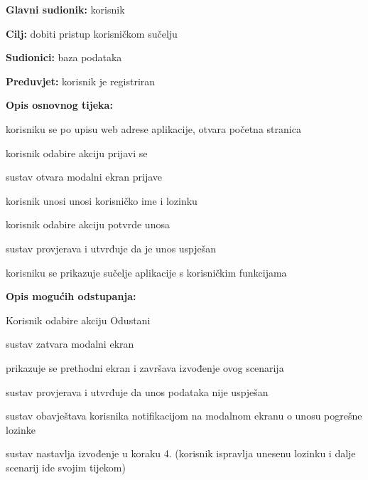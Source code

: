                     \noindent {}
					\begin{packed_item}
	
						\item \textbf{Glavni sudionik: }korisnik
						\item  \textbf{Cilj: }dobiti pristup korisničkom sučelju
						\item  \textbf{Sudionici: }baza podataka
						\item  \textbf{Preduvjet: } korisnik je registriran
						\item  \textbf{Opis osnovnog tijeka:}
						
						\item[] \begin{packed_enum}
							\item korisniku se po upisu web adrese aplikacije, otvara početna stranica
							\item korisnik odabire akciju prijavi se
							\item sustav otvara modalni ekran prijave
							\item korisnik unosi unosi korisničko ime i lozinku
							\item korisnik odabire akciju potvrde unosa
							\item sustav provjerava i utvrđuje da je unos uspješan
							\item korisniku se prikazuje sučelje aplikacije s korisničkim funkcijama

						\end{packed_enum}
						
						\item  \textbf{Opis mogućih odstupanja:}
						
						\item[] \begin{packed_item}
							\item[5.a] Korisnik odabire akciju Odustani
							\item[] 
							\begin{packed_enum} 
								\item sustav zatvara modalni ekran
								\item prikazuje se prethodni ekran i završava izvođenje ovog scenarija
							\end{packed_enum}
							\item[6a]  sustav provjerava i utvrđuje da unos podataka nije uspješan
							\item[] 
							\begin{packed_enum}
								\item sustav obavještava korisnika notifikacijom na modalnom ekranu o unosu pogrešne lozinke
								\item sustav nastavlja izvođenje u koraku 4. (korisnik ispravlja unesenu lozinku i dalje scenarij ide svojim tijekom)
							\end{packed_enum}
							
						\end{packed_item}
					\end{packed_item}

